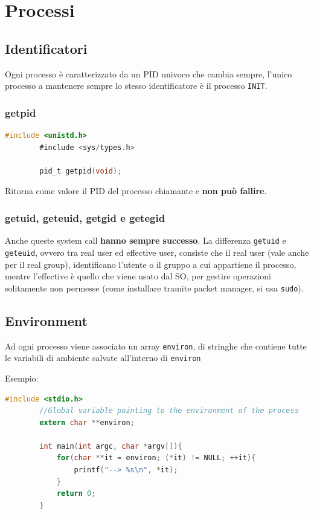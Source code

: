 \documentclass[a4paper, 12pt]{book}
\begin{document}
    \chapter{Processi}

    \section{Identificatori}

    Ogni processo è caratterizzato da un PID univoco che cambia 
    sempre, l'unico processo a mantenere sempre lo stesso 
    identificatore è il processo \verb|INIT|.

    \subsection{getpid}

    \begin{lstlisting}[language=C]
        #include <unistd.h>
        #include <sys/types.h>

        pid_t getpid(void);
    \end{lstlisting}
    Ritorna come valore il PID del processo chiamante e \textbf{non può
    fallire}.

    \subsection{getuid, geteuid, getgid e getegid}

    Anche queste system call \textbf{hanno sempre successo}.
    La differenza \verb|getuid| e \verb|geteuid|, ovvero
    tra real user ed effective user, consiste che il 
    real user (vale anche per il real group), identificano 
    l'utente o il gruppo a cui appartiene il processo, 
    mentre l'effective è quello che viene usato dal SO, 
    per gestire operazioni solitamente non permesse (come 
    installare tramite packet manager, si usa \verb|sudo|). 

    \section{Environment}

    Ad ogni processo viene associato un array \verb|environ|,
    di stringhe che contiene tutte le variabili di
    ambiente salvate all'interno di \verb|environ|

    Esempio:
    \begin{lstlisting}[language=C]
        #include <stdio.h>
        //Global variable pointing to the environment of the process
        extern char **environ;

        int main(int argc, char *argv[]){
            for(char **it = environ; (*it) != NULL; ++it){
                printf("--> %s\n", *it);
            }
            return 0;
        }
    \end{lstlisting}  
    
\end{document}
